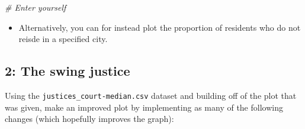 \documentclass[]{book}
\newenvironment{Shaded}{\begin{snugshade}}{\end{snugshade}}
\newcommand{\CommentTok}[1]{\textcolor[rgb]{0.56,0.35,0.01}{\textit{#1}}}
\providecommand{\tightlist}{%
  \setlength{\itemsep}{0pt}\setlength{\parskip}{0pt}}
\theoremstyle{definition}
\theoremstyle{definition}
\theoremstyle{definition}
\theoremstyle{remark}
\begin{document}
\begin{Shaded}
\begin{Highlighting}[]
\begin{Shaded}
\begin{Highlighting}[]
\begin{Shaded}
\begin{Highlighting}[]
\begin{Shaded}
\begin{Highlighting}[]
\CommentTok{# Enter yourself}
\end{Highlighting}
\end{Shaded}

\begin{itemize}
\tightlist
\item
  Alternatively, you can for instead plot the proportion of residents who do not reisde in a specified city.
\end{itemize}

\hypertarget{the-swing-justice}{%
\subsection*{2: The swing justice}\label{the-swing-justice}}

Using the \texttt{justices\_court-median.csv} dataset and building off of the plot that was given, make an improved plot by implementing as many of the following changes (which hopefully improves the graph):


\end{Highlighting}
\end{Shaded}
\end{Highlighting}
\end{Shaded}
\end{Highlighting}
\end{Shaded}
\end{document}
